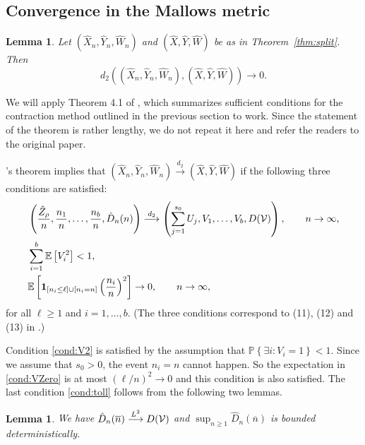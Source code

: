 \documentclass[11pt]{article}
\newcommand{\E}[1]{\mathbb{E} \left[#1\right]}
\newcommand{\ball}[1]{\hat{#1}}
\def\bX{\ball{X}}
\def\bY{\ball{Y}}
\def\bW{\ball{W}}
\newcommand{\bVec}{(\bX, \bY, \bW)}
\newcommand{\bVecN}{(\bX_n, \bY_n, \bW_n)}
\def\bZ{\ball{Z}}
\newcommand{\ind}{{\bf 1}}
\newcommand\cV{{\cal V}}
\newcommand\Prob[1]{{\mathbb{P}\left\{#1\right\}}}
\numberwithin{theorem}{section}
\newtheorem{lemma}[theorem]{Lemma}
\theoremstyle{definition}
\newcommand{\dM}{d_2}
\newcommand{\dMto}{\overset{\dM}{\too}}
\newcommand{\inLII}{\overset{L^{2}}{\too}}
\newcommand{\nBar}{\overline{n}}
\newcommand{\Toll}{D}
\newcommand{\bToll}{\ball{\Toll}}
\newcommand{\bTollN}{\bToll_{n}}
\numberwithin{equation}{section}
\newcommand{\refT}[1]{Theorem~\ref{#1}}
\newcommand{\too}{\longrightarrow}
\begin{document}
\subsection{Convergence in the Mallows metric}\label{sec:Neininger}

\begin{lemma}
    \label{lem:ball:Mallows}
    Let \(\bVecN\) and \(\bVec\) be as in \refT{thm:split}. Then
    \[
        \dM\left(\bVecN, \bVec \right)
        \to
        0.
    \]
\end{lemma}

We will apply Theorem 4.1 of \citet{MR1871564}, which summarizes sufficient conditions for the
contraction method outlined in the previous section to work.  Since the statement of the theorem is
rather lengthy, we do not repeat it here and refer the readers to the original paper.

\citeauthor{MR1871564}'s theorem implies that \(\bVecN \dMto \bVec\) if the following three
conditions are satisfied:
\begin{align}
    & \left(\frac{\bZ_{\rho}}{n}, \frac{n_1}{n},\dots, \frac{n_{b}}{n}, \bTollN(n) \right) \dMto
    \left(\sum_{j=1}^{s_0} U_j, V_1,\dots,V_{b}, \Toll(\cV) \right), 
    \qquad n \to \infty, 
    \label{cond:toll}
    \\
    & \sum_{i=1}^{b} \E{V_i^2} < 1, 
    \label{cond:V2}
    \\
    & \E{\ind_{[n_i \le \ell] \cup [n_i = n]} \left( \frac{n_{i}}{n} \right)^2} \to 0, \qquad n \to \infty,
    \label{cond:VZero}
\end{align}
for all \(\ell \ge 1\) and \(i = 1,\dots,b\).
(The three conditions correspond to (11), (12) and (13) in \cite{MR1871564}.)

Condition \eqref{cond:V2} is satisfied by the assumption that $\Prob{\exists i : V_i = 1} < 1$.
Since we assume that \(s_0 > 0\), the event \(n_i = n\) cannot happen. So the expectation in
\eqref{cond:VZero} is at most \( (\ell/n)^2 \to 0\) and this condition is also satisfied.
The last condition \eqref{cond:toll} follows from the following two lemmas.

\begin{lemma}
    \label{lem:toll:func}
    We have $\bTollN(\nBar) \inLII \Toll(\cV)$ and \(\sup_{n \ge 1} \bTollN(\nBar)\) is bounded deterministically.
\end{lemma}
\end{document}
